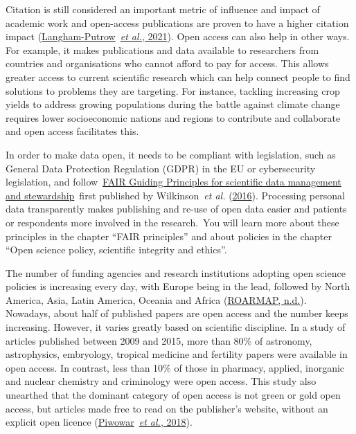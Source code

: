 \documentclass[
]{book}
\begin{document}
Citation is still considered an important metric of influence and impact of academic work and open-access publications are proven to have a higher citation impact (\href{https://journals.plos.org/plosone/article?id=10.1371/journal.pone.0253129}{Langham-Putrow}~\href{https://journals.plos.org/plosone/article?id=10.1371/journal.pone.0253129}{\emph{et al.}}\href{https://journals.plos.org/plosone/article?id=10.1371/journal.pone.0253129}{, 2021}). Open access can also help in other ways. For example, it makes publications and data available to researchers from countries and organisations who cannot afford to pay for access. This allows greater access to current scientific research which can help connect people to find solutions to problems they are targeting. For instance, tackling increasing crop yields to address growing populations during the battle against climate change requires lower socioeconomic nations and regions to contribute and collaborate and open access facilitates this.

In order to make data open, it needs to be compliant with legislation, such as General Data Protection Regulation (GDPR) in the EU or cybersecurity legislation, and follow~\href{http://www.nature.com/articles/sdata201618}{}\href{http://www.nature.com/articles/sdata201618}{FAIR Guiding Principles for scientific data management and stewardship}~first published by Wilkinson~\emph{et al.} (\href{https://www.nature.com/articles/sdata201618}{2016}). Processing personal data transparently makes publishing and re-use of open data easier and patients or respondents more involved in the research.~You will learn more about these principles in the chapter ``FAIR principles'' and about policies in the chapter ``Open science policy, scientific integrity and ethics''.

The number of funding agencies and research institutions adopting open science policies is increasing every day, with Europe being in the lead, followed by North America, Asia, Latin America, Oceania and Africa (\href{https://roarmap.eprints.org/}{ROARMAP, n.d.}). Nowadays, about half of published papers are open access and the number keeps increasing. However, it varies greatly based on scientific discipline. In a study of articles published between 2009 and 2015, more than 80\% of astronomy, astrophysics, embryology, tropical medicine and fertility papers were available in open access. In contrast, less than 10\% of those in pharmacy, applied, inorganic and nuclear chemistry and criminology were open access. This study also unearthed that the dominant category of open access is not green or gold open access, but articles made free to read on the publisher's website, without an explicit open licence (\href{https://peerj.com/articles/4375/?utm_source=TrendMD\&utm_campaign=PeerJ_Tre\%20ndMD_0\&utm_medium=TrendMD}{Piwowar}~\href{https://peerj.com/articles/4375/?utm_source=TrendMD\&utm_campaign=PeerJ_Tre\%20ndMD_0\&utm_medium=TrendMD}{\emph{et al.}}\href{https://peerj.com/articles/4375/?utm_source=TrendMD\&utm_campaign=PeerJ_Tre\%20ndMD_0\&utm_medium=TrendMD}{, 2018}).
\end{document}
